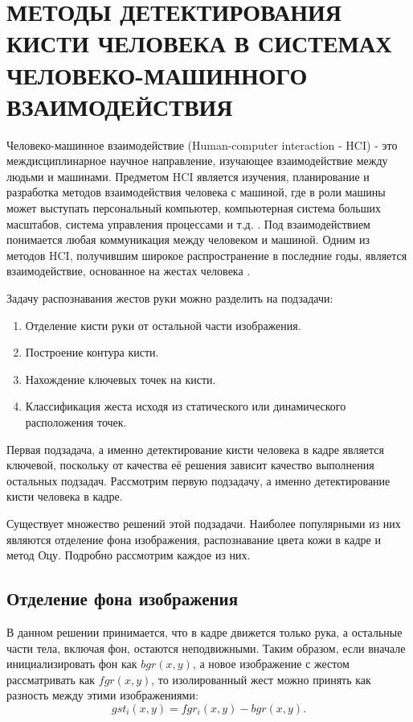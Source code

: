 \section{\nohyphens{МЕТОДЫ ДЕТЕКТИРОВАНИЯ КИСТИ ЧЕЛОВЕКА В СИСТЕМАХ ЧЕЛОВЕКО-МАШИННОГО ВЗАИМОДЕЙСТВИЯ}}

Человеко-машинное взаимодействие (Human-computer interaction - HCI) - это междисциплинарное
научное направление, изучающее взаимодействие между людьми и машинами. Предметом HCI является
изучения, планирование и разработка методов взаимодействия человека с машиной, где в роли машины
может выступать персональный компьютер, компьютерная система больших масштабов, система 
управления процессами и т.д. \cite{dix}. Под взаимодействием понимается любая коммуникация между
человеком и машиной. Одним из методов HCI, получившим широкое распространение в последние годы,
является взаимодействие, основанное на жестах человека \cite{jiangqin, sanna}. 

Задачу распознавания жестов руки можно разделить на подзадачи:
\begin{enumerate}
	\item Отделение кисти руки от остальной части изображения.
	\item Построение контура кисти.
	\item Нахождение ключевых точек на кисти.
	\item Классификация жеста исходя из статического или динамического расположения точек.
\end{enumerate}

Первая подзадача, а именно детектирование кисти человека в кадре является ключевой, поскольку
от качества её решения зависит качество выполнения остальных подзадач.
Рассмотрим первую подзадачу, а именно детектирование кисти человека в кадре.

Существует множество решений этой подзадачи. Наиболее популярными из них являются 
отделение фона изображения, распознавание цвета 
кожи в кадре и метод Оцу. 
Подробно рассмотрим каждое из них.

\subsection{Отделение фона изображения}

В данном решении принимается, что в кадре движется только рука, а остальные части
тела, включая фон, остаются неподвижными. Таким образом, если вначале инициализировать фон как
$bgr(x, y)$, а новое изображение с жестом рассматривать как $fgr(x, y)$, то изолированный жест
можно принять как разность между этими изображениями: 
\begin{equation} gst_i(x,y)=fgr_i(x,y)-bgr(x,y). \label{first}\end{equation}

